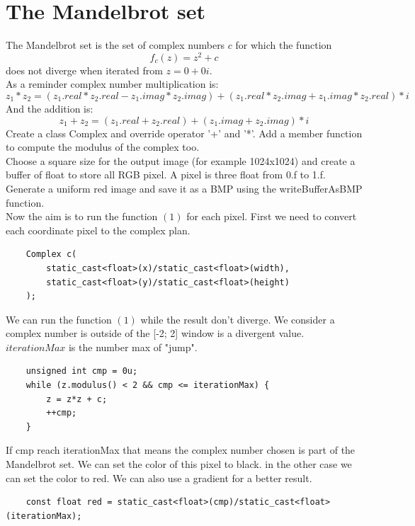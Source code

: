 \documentclass{article}
\begin{document}
\section{The Mandelbrot set}
The Mandelbrot set is the set of complex numbers $c$ for which the function
\begin{equation}
f_c(z) = z^2+c
\end{equation}
does not diverge when iterated from $z = 0+0i$.\\
As a reminder complex number multiplication is:
\begin{equation}
z_1*z_2 = (z_1.real*z_2.real-z_1.imag*z_2.imag) + (z_1.real*z_2.imag + z_1.imag*z_2.real)*i
\end{equation}
And the addition is:
\begin{equation}
z_1 + z_2 = (z_1.real + z_2.real) + (z_1.imag + z_2.imag)*i
\end{equation}
Create a class Complex and override operator '+' and '*'. Add a member function to compute the modulus of the complex too.\\
Choose a square size for the output image (for example 1024x1024) and create a buffer of float to store all RGB pixel. A pixel is three float from 0.f to 1.f. Generate a uniform red image and save it as a BMP using the writeBufferAsBMP function.\\
Now the aim is to run the function $(1)$ for each pixel. First we need to convert each coordinate pixel to the complex plan.
\begin{lstlisting}
	Complex c(
		static_cast<float>(x)/static_cast<float>(width),
		static_cast<float>(y)/static_cast<float>(height)
	);
\end{lstlisting}
We can run the function $(1)$ while the result don't diverge. We consider a complex number is outside of the [-2; 2] window is a divergent value. $iterationMax$ is the number max of "jump".
\begin{lstlisting}
	unsigned int cmp = 0u;
	while (z.modulus() < 2 && cmp <= iterationMax) {
		z = z*z + c;
		++cmp;
	}
\end{lstlisting}
If cmp reach iterationMax that means the complex number chosen is part of the Mandelbrot set. We can set the color of this pixel to black. in the other case we can set the color to red. We can also use a gradient for a better result.
\begin{lstlisting}
	const float red = static_cast<float>(cmp)/static_cast<float>(iterationMax);
\end{lstlisting}
\end{document}
